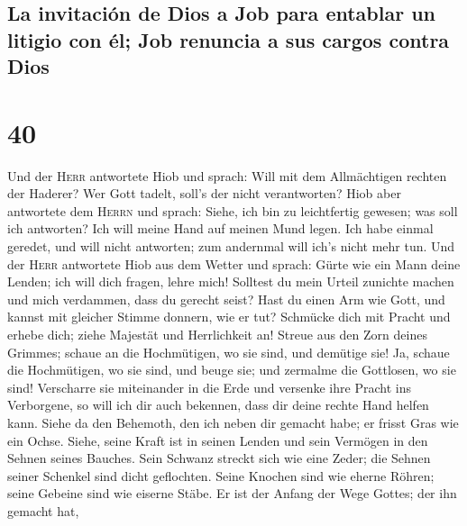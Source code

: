 \hypertarget{la-invitaciuxf3n-de-dios-a-job-para-entablar-un-litigio-con-uxe9l-job-renuncia-a-sus-cargos-contra-dios}{%
\subsection{La invitación de Dios a Job para entablar un litigio con él;
Job renuncia a sus cargos contra
Dios}\label{la-invitaciuxf3n-de-dios-a-job-para-entablar-un-litigio-con-uxe9l-job-renuncia-a-sus-cargos-contra-dios}}

\hypertarget{section-39}{%
\section{40}\label{section-39}}

 Und der \textsc{Herr} antwortete Hiob und sprach:
 Will mit dem Allmächtigen rechten der Haderer? Wer Gott
tadelt, soll's der nicht verantworten?  Hiob aber
antwortete dem \textsc{Herrn} und sprach:  Siehe, ich bin
zu leichtfertig gewesen; was soll ich antworten? Ich will meine Hand auf
meinen Mund legen.  Ich habe einmal geredet, und will
nicht antworten; zum andernmal will ich's nicht mehr tun. 
Und der \textsc{Herr} antwortete Hiob aus dem Wetter und sprach:
 Gürte wie ein Mann deine Lenden; ich will dich fragen,
lehre mich!  Solltest du mein Urteil zunichte machen und
mich verdammen, dass du gerecht seist?  Hast du einen Arm
wie Gott, und kannst mit gleicher Stimme donnern, wie er tut?
 Schmücke dich mit Pracht und erhebe dich; ziehe Majestät
und Herrlichkeit an!  Streue aus den Zorn deines Grimmes;
schaue an die Hochmütigen, wo sie sind, und demütige sie!
 Ja, schaue die Hochmütigen, wo sie sind, und beuge sie;
und zermalme die Gottlosen, wo sie sind!  Verscharre sie
miteinander in die Erde und versenke ihre Pracht ins Verborgene,
 so will ich dir auch bekennen, dass dir deine rechte
Hand helfen kann.  Siehe da den Behemoth, den ich neben
dir gemacht habe; er frisst Gras wie ein Ochse.  Siehe,
seine Kraft ist in seinen Lenden und sein Vermögen in den Sehnen seines
Bauches.  Sein Schwanz streckt sich wie eine Zeder; die
Sehnen seiner Schenkel sind dicht geflochten.  Seine
Knochen sind wie eherne Röhren; seine Gebeine sind wie eiserne Stäbe.
 Er ist der Anfang der Wege Gottes; der ihn gemacht hat,
